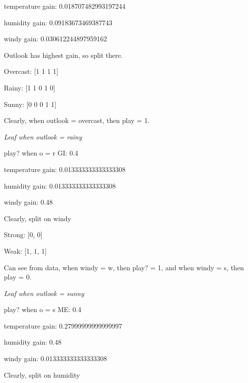 \documentclass[12pt, fullpage,letterpaper]{article}
\begin{document}
\begin{enumerate}
\begin{enumerate}
    temperature gain: 0.018707482993197244
    
    humidity gain: 0.09183673469387743
    
    windy gain: 0.030612244897959162
    
    \vspace{5mm}
    
    Outlook has highest gain, so split there.
    
    \vspace{5mm}

    Overcast: [1 1 1 1]

    Rainy: [1 1 0 1 0]

    Sunny: [0 0 0 1 1]

    Clearly, when outlook = overcast, then play = 1.
    
    \vspace{5mm}
    
    \emph{Leaf when outlook = rainy}
    
    play? when o = r GI:  0.4
    
    temperature gain: 0.013333333333333308
    
    humidity gain: 0.013333333333333308
    
    windy gain: 0.48
    
    \vspace{5mm}

    Clearly, split on windy
    
    \vspace{5mm}

    Strong: [0, 0]
    
    Weak: [1, 1, 1]
    
    \vspace{5mm}
    
    Can see from data, when windy = w, then play? = 1, and when windy = s, then play = 0.
    
    \vspace{5mm}
    
    \emph{Leaf when outlook = sunny}
    
    play? when o = s ME:  0.4
    
    temperature gain: 0.27999999999999997
    
    humidity gain: 0.48
    
    windy gain: 0.013333333333333308

    \vspace{5mm}
    
    Clearly, split on humidity
    

\end{enumerate}
\end{enumerate}
\end{document}
